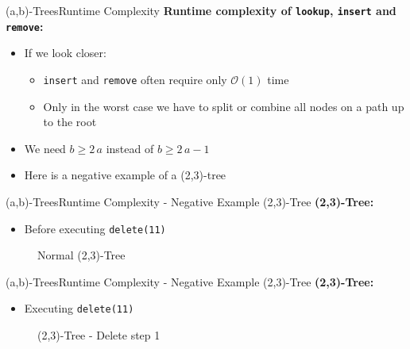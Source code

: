 \begin{frame}{(a,b)-Trees}{Runtime Complexity}
  \textbf{Runtime complexity of \texttt{\color{Mittel-Blau}lookup},
    \texttt{\color{Mittel-Blau}insert} and \texttt{\color{Mittel-Blau}remove}:}
  \begin{itemize}
    \item
      If we look closer:
      \begin{itemize}
        \item
          \texttt{\color{Mittel-Blau}insert} and
          \texttt{\color{Mittel-Blau}remove}
          often require only $\mathcal{O}(1)$ time
        \item
          Only in the {\color{Mittel-Blau}worst case} we have to
          {\color{Mittel-Blau}split} or
          {\color{Mittel-Blau}combine} all nodes on a path up to the root
      \end{itemize}
    \item
      We need {\color{Mittel-Blau}$b \geq 2 \, a$} instead of
      {\color{Mittel-Blau}$b \geq 2 \, a - 1$}
    \item
      Here is a negative example of a (2,3)-tree
  \end{itemize}
\end{frame}


\begin{frame}{(a,b)-Trees}{Runtime Complexity - Negative Example (2,3)-Tree}
  \textbf{(2,3)-Tree:}
  \begin{itemize}
    \item
      Before executing \texttt{\color{Mittel-Blau}delete(11)}
  \end{itemize}
  \begin{figure}
    \begin{adjustbox}{width=0.6\linewidth}
      
    \end{adjustbox}
    \label{fig:a_b_tree:2_3_tree_1}
    \caption{Normal (2,3)-Tree}
  \end{figure}
\end{frame}


\begin{frame}{(a,b)-Trees}{Runtime Complexity - Negative Example (2,3)-Tree}
  \textbf{(2,3)-Tree:}
  \begin{itemize}
    \item
      Executing \texttt{\color{Mittel-Blau}delete(11)}
  \end{itemize}
  \begin{figure}
    \begin{adjustbox}{width=0.6\linewidth}
      
    \end{adjustbox}
    \label{fig:a_b_tree:2_3_tree_2}
    \caption{(2,3)-Tree - Delete step 1}
  \end{figure}
\end{frame}

